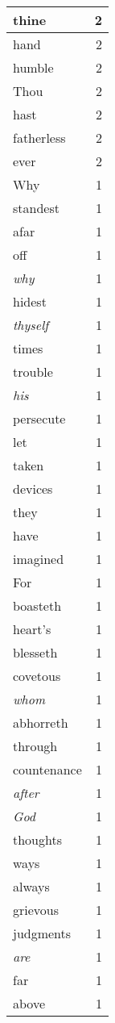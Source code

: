 \begin{center}
\begin{longtable}{l|r}
thine & 2 \\ \hline
hand & 2 \\ \hline
humble & 2 \\ \hline
Thou & 2 \\ \hline
hast & 2 \\ \hline
fatherless & 2 \\ \hline
ever & 2 \\ \hline
Why & 1 \\ \hline
standest & 1 \\ \hline
afar & 1 \\ \hline
off & 1 \\ \hline
\emph{why} & 1 \\ \hline
hidest & 1 \\ \hline
\emph{thyself} & 1 \\ \hline
times & 1 \\ \hline
trouble & 1 \\ \hline
\emph{his} & 1 \\ \hline
persecute & 1 \\ \hline
let & 1 \\ \hline
taken & 1 \\ \hline
devices & 1 \\ \hline
they & 1 \\ \hline
have & 1 \\ \hline
imagined & 1 \\ \hline
For & 1 \\ \hline
boasteth & 1 \\ \hline
heart's & 1 \\ \hline
blesseth & 1 \\ \hline
covetous & 1 \\ \hline
\emph{whom} & 1 \\ \hline
abhorreth & 1 \\ \hline
through & 1 \\ \hline
countenance & 1 \\ \hline
\emph{after} & 1 \\ \hline
\emph{God} & 1 \\ \hline
thoughts & 1 \\ \hline
ways & 1 \\ \hline
always & 1 \\ \hline
grievous & 1 \\ \hline
judgments & 1 \\ \hline
\emph{are} & 1 \\ \hline
far & 1 \\ \hline
above & 1 \\ \hline

\end{longtable}
\end{center}
